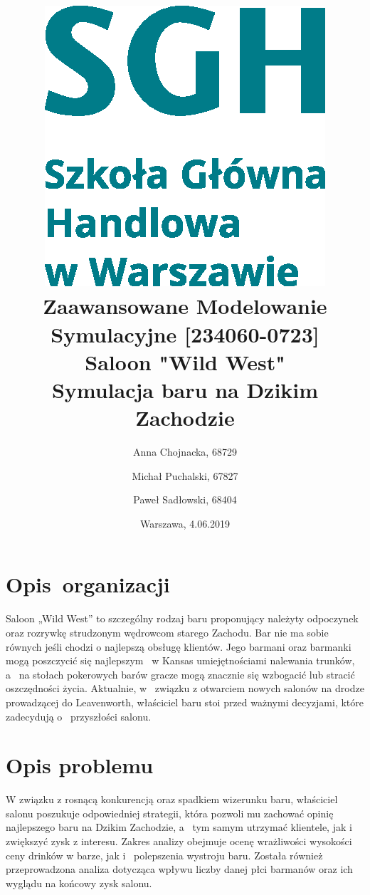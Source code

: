 \documentclass[12pt, a4paper, oneside]{mwart} %
\begin{document}
\title{\includegraphics[width = 0.3 \textwidth]{wykresy/SGHlogotypCMYKpl.eps}\\
\bigskip
Zaawansowane Modelowanie Symulacyjne [234060-0723]\\ 
\bigskip
Saloon "Wild West"\\
Symulacja baru na Dzikim Zachodzie}
\author{Anna Chojnacka, 68729 \and
Michał Puchalski, 67827 \and
Paweł Sadłowski, 68404 }
\date{Warszawa, 4.06.2019}
\maketitle

\pagebreak

\section{Opis~organizacji}
Saloon „Wild West” to szczególny rodzaj baru proponujący należyty odpoczynek oraz rozrywkę strudzonym wędrowcom starego Zachodu. Bar nie ma sobie równych jeśli chodzi o najlepszą obsługę klientów. Jego barmani oraz barmanki mogą poszczycić się najlepszym ~w Kansas umiejętnościami nalewania trunków, a~ na stołach pokerowych barów gracze mogą znacznie się wzbogacić lub stracić oszczędności życia. Aktualnie, w~ związku z otwarciem nowych salonów na drodze prowadzącej do Leavenworth, właściciel baru stoi przed ważnymi decyzjami, które zadecydują o~ przyszłości salonu.

\section{Opis problemu}
W związku z rosnącą konkurencją oraz spadkiem wizerunku baru, właściciel salonu poszukuje odpowiedniej strategii, która pozwoli mu zachować opinię najlepszego baru na Dzikim Zachodzie, a~ tym samym utrzymać klientele, jak i~ zwiększyć zysk z interesu. Zakres analizy obejmuje ocenę wrażliwości wysokości ceny drinków w barze, jak i~ polepszenia wystroju baru. Została również przeprowadzona analiza dotycząca wpływu liczby danej płci barmanów oraz ich wyglądu na końcowy zysk salonu.
\end{document}
